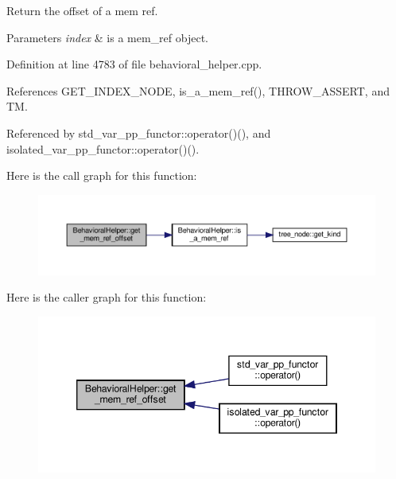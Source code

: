 Return the offset of a mem ref. 


\begin{DoxyParams}{Parameters}
{\em index} & is a mem\+\_\+ref object. \\
\hline
\end{DoxyParams}


Definition at line 4783 of file behavioral\+\_\+helper.\+cpp.



References G\+E\+T\+\_\+\+I\+N\+D\+E\+X\+\_\+\+N\+O\+DE, is\+\_\+a\+\_\+mem\+\_\+ref(), T\+H\+R\+O\+W\+\_\+\+A\+S\+S\+E\+RT, and TM.



Referenced by std\+\_\+var\+\_\+pp\+\_\+functor\+::operator()(), and isolated\+\_\+var\+\_\+pp\+\_\+functor\+::operator()().

Here is the call graph for this function\+:
\nopagebreak
\begin{figure}[H]
\begin{center}
\leavevmode
\includegraphics[width=350pt]{dd/db2/classBehavioralHelper_a58132ba58a157b34ad4e69a1ca1a5802_cgraph}
\end{center}
\end{figure}
Here is the caller graph for this function\+:
\nopagebreak
\begin{figure}[H]
\begin{center}
\leavevmode
\includegraphics[width=346pt]{dd/db2/classBehavioralHelper_a58132ba58a157b34ad4e69a1ca1a5802_icgraph}
\end{center}
\end{figure}
\mbox{\label{classBehavioralHelper_a162faea94bfa7a1de0215fd15013c6e4}} 
